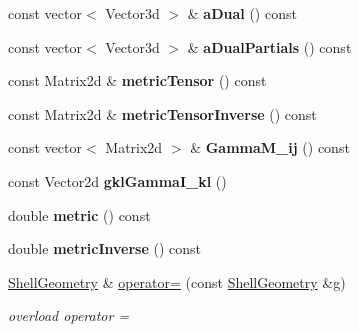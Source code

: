 \begin{DoxyCompactItemize}
\item 
\hypertarget{classvoom_1_1_shell_geometry_a89f6d554426432638bb8b3f3033dee7b}{
const vector$<$ Vector3d $>$ \& {\bfseries aDual} () const }
\label{classvoom_1_1_shell_geometry_a89f6d554426432638bb8b3f3033dee7b}

\item 
\hypertarget{classvoom_1_1_shell_geometry_a01ade29028ddf5abe10fa7499943d6a2}{
const vector$<$ Vector3d $>$ \& {\bfseries aDualPartials} () const }
\label{classvoom_1_1_shell_geometry_a01ade29028ddf5abe10fa7499943d6a2}

\item 
\hypertarget{classvoom_1_1_shell_geometry_a859e61d838d54218c6fa17b847a32a5c}{
const Matrix2d \& {\bfseries metricTensor} () const }
\label{classvoom_1_1_shell_geometry_a859e61d838d54218c6fa17b847a32a5c}

\item 
\hypertarget{classvoom_1_1_shell_geometry_af1b8868bcba120cd4115685aa9d7c2be}{
const Matrix2d \& {\bfseries metricTensorInverse} () const }
\label{classvoom_1_1_shell_geometry_af1b8868bcba120cd4115685aa9d7c2be}

\item 
\hypertarget{classvoom_1_1_shell_geometry_a6d9f63d6f75904a00e685b0cff7b3d16}{
const vector$<$ Matrix2d $>$ \& {\bfseries GammaM\_\-ij} () const }
\label{classvoom_1_1_shell_geometry_a6d9f63d6f75904a00e685b0cff7b3d16}

\item 
\hypertarget{classvoom_1_1_shell_geometry_a9c33fa103026547f916b89ccfdb5c260}{
const Vector2d {\bfseries gklGammaI\_\-kl} ()}
\label{classvoom_1_1_shell_geometry_a9c33fa103026547f916b89ccfdb5c260}

\item 
\hypertarget{classvoom_1_1_shell_geometry_aebdaaaddec48fb40b4b87dca7fed6620}{
double {\bfseries metric} () const }
\label{classvoom_1_1_shell_geometry_aebdaaaddec48fb40b4b87dca7fed6620}

\item 
\hypertarget{classvoom_1_1_shell_geometry_a3fbcae9ab4deb74d6552b66fa3e14038}{
double {\bfseries metricInverse} () const }
\label{classvoom_1_1_shell_geometry_a3fbcae9ab4deb74d6552b66fa3e14038}

\item 
\hypertarget{classvoom_1_1_shell_geometry_a195c0d8ade00e1d71f75d635edf268e4}{
\hyperlink{classvoom_1_1_shell_geometry}{ShellGeometry} \& \hyperlink{classvoom_1_1_shell_geometry_a195c0d8ade00e1d71f75d635edf268e4}{operator=} (const \hyperlink{classvoom_1_1_shell_geometry}{ShellGeometry} \&g)}
\label{classvoom_1_1_shell_geometry_a195c0d8ade00e1d71f75d635edf268e4}

\begin{DoxyCompactList}\small\item\em overload operator = \item\end{DoxyCompactList}\end{DoxyCompactItemize}


